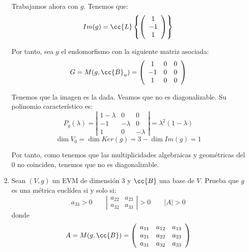\documentclass[12pt]{article}
\begin{document}
\begin{ejercicio}
\begin{enumerate}
    \vspace{1cm}

    Trabajamos ahora con $g$. Tenemos que:
    \begin{equation*}
        Im(g)=\cc{L}\left\{
        \left(\begin{array}{c}
            1 \\ -1 \\ 1
        \end{array}\right)
        \right\}
    \end{equation*}

    Por tanto, sea $g$ el endomorfismo con la siguiente matriz asociada:
    \begin{equation*}
        G=M(g,\cc{B}_u)=
        \left(\begin{array}{ccc}
            1 & 0 & 0 \\
            -1 & 0 & 0 \\
            1 & 0 & 0
        \end{array}\right)
    \end{equation*}

    Tenemos que la imagen es la dada. Veamos que no es diagonalizable. Su polinomio característico es:
    \begin{equation*}
        P_g(\lambda)=\left|\begin{array}{ccc}
            1-\lambda & 0 & 0 \\
            -1 & -\lambda & 0 \\
            1 & 0 & -\lambda
        \end{array}\right| = \lambda^2(1-\lambda)
    \end{equation*}
    \begin{equation*}
        \dim V_0 = \dim Ker(g) = 3-\dim Im(g)=1
    \end{equation*}

    Por tanto, como tenemos que las multiplicidades algebraicas y geométricas del 0 no coinciden, tenemos que no es diagonalizable.


    \item Sean $(V,g)$ un EVM de dimensión 3 y $\cc{B}$ una base de $V$. Prueba que $g$ es una métrica euclídea si y solo si:
    \begin{equation*}
        a_{33}>0 \qquad \left|\begin{array}{cc}
            a_{22} & a_{23} \\
            a_{32} & a_{33}
        \end{array}\right| >0
        \qquad |A|>0
    \end{equation*}
    donde
    \begin{equation*}
        A=M(g,\cc{B})=\left(\begin{array}{ccc}
            a_{11} & a_{12} & a_{13} \\
            a_{21} & a_{22} & a_{23} \\
            a_{31} & a_{32} & a_{33}
        \end{array}\right)
    \end{equation*}




\end{enumerate}
\end{ejercicio}
\end{document}
